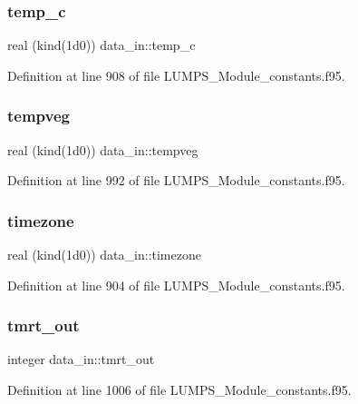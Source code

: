 \subsubsection{\texorpdfstring{temp\+\_\+c}{temp\_c}}
{\footnotesize\ttfamily real (kind(1d0)) data\+\_\+in\+::temp\+\_\+c}



Definition at line 908 of file L\+U\+M\+P\+S\+\_\+\+Module\+\_\+constants.\+f95.

\mbox{\label{namespacedata__in_afff1f4919ba95d947fa5e34493cc9fa3}} 
\subsubsection{\texorpdfstring{tempveg}{tempveg}}
{\footnotesize\ttfamily real (kind(1d0)) data\+\_\+in\+::tempveg}



Definition at line 992 of file L\+U\+M\+P\+S\+\_\+\+Module\+\_\+constants.\+f95.

\mbox{\label{namespacedata__in_ae7c74e8cbd3c208e00306eafe50a98c0}} 
\subsubsection{\texorpdfstring{timezone}{timezone}}
{\footnotesize\ttfamily real (kind(1d0)) data\+\_\+in\+::timezone}



Definition at line 904 of file L\+U\+M\+P\+S\+\_\+\+Module\+\_\+constants.\+f95.

\mbox{\label{namespacedata__in_ab2df8c3fb9195933d38aeda912642950}} 
\subsubsection{\texorpdfstring{tmrt\+\_\+out}{tmrt\_out}}
{\footnotesize\ttfamily integer data\+\_\+in\+::tmrt\+\_\+out}



Definition at line 1006 of file L\+U\+M\+P\+S\+\_\+\+Module\+\_\+constants.\+f95.

